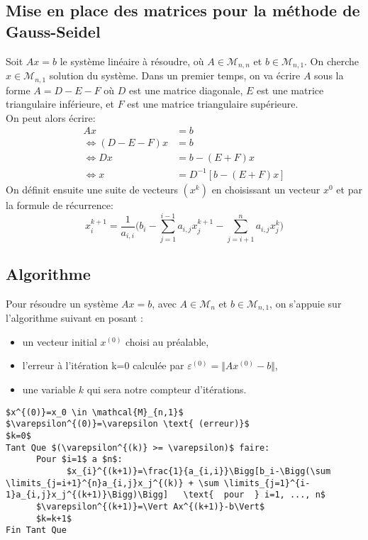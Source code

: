 \subsection{Mise en place des matrices pour la méthode de Gauss-Seidel}\label{decompMatrice}
Soit $Ax=b$ le système linéaire à résoudre, où $A\in \mathcal{M}_{n,n}$ et $b\in  \mathcal{M}_{n,1}$. On cherche $x\in \mathcal{M}_{n,1}$ solution du système.
Dans un premier temps, on va écrire $A$ sous la forme $A=D-E-F$ où $D$ est une matrice diagonale, $E$ est une matrice triangulaire inférieure, et $F$ est une matrice triangulaire supérieure. \\
On peut alors écrire:
\begin{align}
  Ax&=b \\
  \Leftrightarrow  (D-E-F)x&=b \\
  \Leftrightarrow  Dx&=b-(E+F)x \\
  \Leftrightarrow  x&=D^{-1}[b-(E+F)x]
\end{align}
On définit ensuite une suite de vecteurs $(x^k)$ en choisissant un vecteur $x^0$ et par la formule de récurrence:\\
\begin{equation}
  x_i^{k+1}=\frac{1}{a_{i,i}}\Bigg(b_i-\sum \limits_{j = 1}^{i-1}a_{i,j}x_{j}^{k+1} - \sum \limits_{j = i+1}^{n}a_{i,j}x_{j}^{k}\Bigg)
\end{equation}
\newpage
\subsection{Algorithme}
Pour résoudre un système $Ax=b$, avec $A \in \mathcal{M}_{n}$ et $b\in \mathcal{M}_{n,1}$, on s'appuie sur l'algorithme suivant en posant :
\begin{itemize}
  \item un vecteur initial $x^{(0)}$ choisi au préalable,
  \item l'erreur à l'itération k=0 calculée par $\varepsilon^{(0)}=\Vert Ax^{(0)}-b\Vert$,
  \item une variable $k$ qui sera notre compteur d'itérations.
\end{itemize}\vspace{6pt}
\label{algogs}

\begin{lstlisting}[mathescape=true, frame=single, basicstyle=\linespread{1.5}\fontsize{8}{10}\selectfont]
$x^{(0)}=x_0 \in \mathcal{M}_{n,1}$
$\varepsilon^{(0)}=\varepsilon \text{ (erreur)}$
$k=0$
Tant Que $(\varepsilon^{(k)} >= \varepsilon)$ faire:
      Pour $i=1$ a $n$:
            $x_{i}^{(k+1)}=\frac{1}{a_{i,i}}\Bigg[b_i-\Bigg(\sum \limits_{j=i+1}^{n}a_{i,j}x_j^{(k)} + \sum \limits_{j=1}^{i-1}a_{i,j}x_j^{(k+1)}\Bigg)\Bigg]   \text{  pour  } i=1, ..., n$
      $\varepsilon^{(k+1)}=\Vert Ax^{(k+1)}-b\Vert$
      $k=k+1$
Fin Tant Que
\end{lstlisting}
